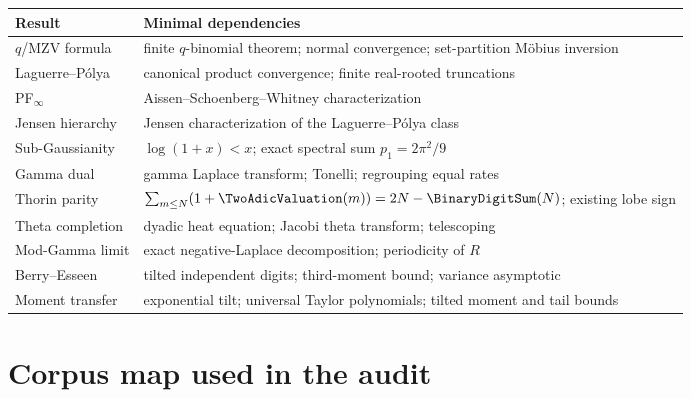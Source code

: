 \documentclass[11pt]{article}
\numberwithin{equation}{section}
\theoremstyle{definition}
\theoremstyle{remark}
\begin{document}
\begin{longtable}{@{}p{}p{}@{}}
\toprule
Result & Minimal dependencies\\
\midrule
\endhead
$q$/MZV formula & finite $q$-binomial theorem; normal convergence; set-partition
M\"obius inversion\\
Laguerre--P\'olya & canonical product convergence; finite real-rooted
truncations\\
PF$_\infty$ & Aissen--Schoenberg--Whitney characterization\\
Jensen hierarchy & Jensen characterization of the Laguerre--P\'olya class\\
Sub-Gaussianity & $\log(1+x)<x$; exact spectral sum $p_1=2\pi^2/9$\\
Gamma dual & gamma Laplace transform; Tonelli; regrouping equal rates\\
Thorin parity & $\sum_{m\le N}(1+\TwoAdicValuation(m))=2N-\BinaryDigitSum(N)$; existing lobe sign\\
Theta completion & dyadic heat equation; Jacobi theta transform; telescoping\\
Mod-Gamma limit & exact negative-Laplace decomposition; periodicity of $R$\\
Berry--Esseen & tilted independent digits; third-moment bound; variance asymptotic\\
Moment transfer & exponential tilt; universal Taylor polynomials; tilted moment
and tail bounds\\
\bottomrule
\end{longtable}

\section{Corpus map used in the audit}
\end{document}
